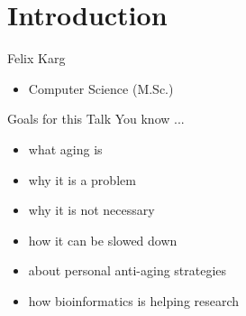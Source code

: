 \section{Introduction}

\begin{frame}[c]{Felix Karg}

    \begin{multicols}{2}
    \begin{itemize}[<+(1)->]
        \item Computer Science (M.Sc.)
    \end{itemize}
    \end{multicols}
\end{frame}



\begin{frame}[c]{Goals for this Talk}
    You know ...
    \begin{itemize}[<+(1)->]
        \item what aging is
        \item why it is a problem
        \item why it is not necessary
        \item how it can be slowed down
        \item about personal anti-aging strategies
        \item how bioinformatics is helping research
    \end{itemize}
\end{frame}
